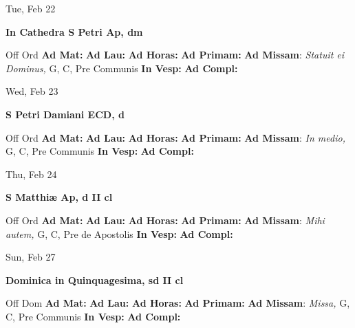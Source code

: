 \documentclass[10pt]{article}
\begin{document}
\begin{minipage}{3.5in}
\vspace{2em}\begin{center}
Tue, Feb 22
\end{center}\textbf{ \large In Cathedra S Petri Ap, \textnormal{\normalsize dm}}
\begin{justify}
Off Ord
\textbf{Ad Mat: }
\textbf{Ad Lau: }
\textbf{Ad Horas: }
\textbf{Ad Primam: }
\textbf{Ad Missam}: \textit{Statuit ei Dominus,} G, C, Pre Communis
\textbf{In Vesp: }
\textbf{Ad Compl: }\end{justify}
\end{minipage}



\begin{minipage}{3.5in}
\vspace{2em}\begin{center}
Wed, Feb 23
\end{center}\textbf{ \large S Petri Damiani ECD, \textnormal{\normalsize d}}
\begin{justify}
Off Ord
\textbf{Ad Mat: }
\textbf{Ad Lau: }
\textbf{Ad Horas: }
\textbf{Ad Primam: }
\textbf{Ad Missam}: \textit{In medio,} G, C, Pre Communis
\textbf{In Vesp: }
\textbf{Ad Compl: }\end{justify}
\end{minipage}



\begin{minipage}{3.5in}
\vspace{2em}\begin{center}
Thu, Feb 24
\end{center}\textbf{ \large S Matthiæ Ap, \textnormal{\normalsize d II cl}}
\begin{justify}
Off Ord
\textbf{Ad Mat: }
\textbf{Ad Lau: }
\textbf{Ad Horas: }
\textbf{Ad Primam: }
\textbf{Ad Missam}: \textit{Mihi autem,} G, C, Pre de Apostolis
\textbf{In Vesp: }
\textbf{Ad Compl: }\end{justify}
\end{minipage}



\begin{minipage}{3.5in}
\vspace{2em}\begin{center}
Sun, Feb 27
\end{center}\textbf{ \large Dominica in Quinquagesima, \textnormal{\normalsize sd II cl}}
\begin{justify}
Off Dom
\textbf{Ad Mat: }
\textbf{Ad Lau: }
\textbf{Ad Horas: }
\textbf{Ad Primam: }
\textbf{Ad Missam}: \textit{Missa,} G, C, Pre Communis
\textbf{In Vesp: }
\textbf{Ad Compl: }\end{justify}
\end{minipage}
\end{document}
